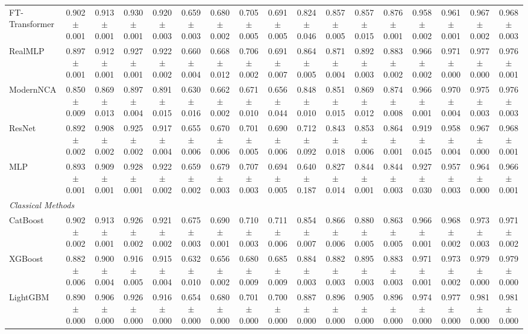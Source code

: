 \begin{table}[t]
{\begin{tabular}{lcccccccccccccccc}
FT-Transformer & 0.902$\pm$0.001 & 0.913$\pm$0.001 & 0.930$\pm$0.001 & 0.920$\pm$0.003 & 0.659$\pm$0.003 & 0.680$\pm$0.002 & 0.705$\pm$0.005 & 0.691$\pm$0.005 & 0.824$\pm$0.046 & 0.857$\pm$0.005 & 0.857$\pm$0.015 & 0.876$\pm$0.001 & 0.958$\pm$0.002 & 0.961$\pm$0.001 & 0.967$\pm$0.002 & 0.968$\pm$0.003 \\
RealMLP & 0.897$\pm$0.001 & 0.912$\pm$0.001 & 0.927$\pm$0.001 & 0.922$\pm$0.002 & 0.660$\pm$0.004 & 0.668$\pm$0.012 & 0.706$\pm$0.002 & 0.691$\pm$0.007 & 0.864$\pm$0.005 & 0.871$\pm$0.004 & 0.892$\pm$0.003 & 0.883$\pm$0.002 & 0.966$\pm$0.002 & 0.971$\pm$0.000 & 0.977$\pm$0.000 & 0.976$\pm$0.001 \\
ModernNCA & 0.850$\pm$0.009 & 0.869$\pm$0.013 & 0.897$\pm$0.004 & 0.891$\pm$0.015 & 0.630$\pm$0.016 & 0.662$\pm$0.002 & 0.671$\pm$0.010 & 0.656$\pm$0.044 & 0.848$\pm$0.010 & 0.851$\pm$0.015 & 0.869$\pm$0.012 & 0.874$\pm$0.008 & 0.966$\pm$0.001 & 0.970$\pm$0.004 & 0.975$\pm$0.003 & 0.976$\pm$0.003 \\
ResNet & 0.892$\pm$0.002 & 0.908$\pm$0.002 & 0.925$\pm$0.002 & 0.917$\pm$0.004 & 0.655$\pm$0.006 & 0.670$\pm$0.006 & 0.701$\pm$0.005 & 0.690$\pm$0.006 & 0.712$\pm$0.092 & 0.843$\pm$0.018 & 0.853$\pm$0.006 & 0.864$\pm$0.001 & 0.919$\pm$0.045 & 0.958$\pm$0.004 & 0.967$\pm$0.000 & 0.968$\pm$0.001 \\
MLP & 0.893$\pm$0.001 & 0.909$\pm$0.001 & 0.928$\pm$0.001 & 0.922$\pm$0.002 & 0.659$\pm$0.002 & 0.679$\pm$0.003 & 0.707$\pm$0.003 & 0.694$\pm$0.005 & 0.640$\pm$0.187 & 0.827$\pm$0.014 & 0.844$\pm$0.001 & 0.844$\pm$0.003 & 0.927$\pm$0.030 & 0.957$\pm$0.003 & 0.964$\pm$0.000 & 0.966$\pm$0.001 \\
\midrule
\multicolumn{17}{l}{\textit{Classical Methods}} \\
CatBoost & 0.902$\pm$0.002 & 0.913$\pm$0.001 & 0.926$\pm$0.002 & 0.921$\pm$0.002 & 0.675$\pm$0.003 & 0.690$\pm$0.001 & 0.710$\pm$0.003 & 0.711$\pm$0.006 & 0.854$\pm$0.007 & 0.866$\pm$0.006 & 0.880$\pm$0.005 & 0.863$\pm$0.005 & 0.966$\pm$0.001 & 0.968$\pm$0.002 & 0.973$\pm$0.003 & 0.971$\pm$0.002 \\
XGBoost & 0.882$\pm$0.006 & 0.900$\pm$0.004 & 0.916$\pm$0.005 & 0.915$\pm$0.004 & 0.632$\pm$0.010 & 0.656$\pm$0.002 & 0.680$\pm$0.009 & 0.685$\pm$0.009 & 0.884$\pm$0.003 & 0.882$\pm$0.003 & 0.895$\pm$0.003 & 0.883$\pm$0.003 & 0.971$\pm$0.001 & 0.973$\pm$0.002 & 0.979$\pm$0.000 & 0.979$\pm$0.000 \\
LightGBM & 0.890$\pm$0.000 & 0.906$\pm$0.000 & 0.926$\pm$0.000 & 0.916$\pm$0.000 & 0.654$\pm$0.000 & 0.680$\pm$0.000 & 0.701$\pm$0.000 & 0.700$\pm$0.000 & 0.887$\pm$0.000 & 0.896$\pm$0.000 & 0.905$\pm$0.000 & 0.896$\pm$0.000 & 0.974$\pm$0.000 & 0.977$\pm$0.000 & 0.981$\pm$0.000 & 0.981$\pm$0.000 \\
\bottomrule
\end{tabular}}
\end{table}
